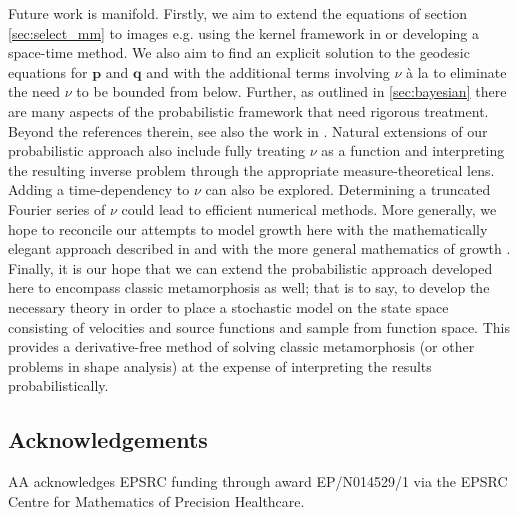 \documentclass[runningheads]{llncs}
\begin{document}
Future work is manifold. Firstly, we aim to extend the equations of section
\ref{sec:select_mm} to images e.g. using the kernel framework in
\cite{richardson2016metamorphosis} or developing a space-time method. We also
aim to find an explicit solution to the geodesic equations for $\mathbf p$ and
$\mathbf q$ and with the additional terms involving $\nu$ à la
\cite{trouve2005local} to eliminate the need $\nu$ to be bounded from below.
Further, as outlined in \ref{sec:bayesian} there
are many aspects of the probabilistic framework that need rigorous treatment.
Beyond the references therein, see also the work in \cite{dashti2013map}.
Natural extensions of our probabilistic approach also include fully treating
$\nu$ as a function and interpreting the resulting inverse problem through the
appropriate measure-theoretical lens. Adding a time-dependency to $\nu$ can also
be explored. Determining a truncated Fourier series of $\nu$ could lead to
efficient numerical methods. More generally, we hope to reconcile our attempts
to model growth here with the mathematically elegant approach described
in \cite{kaltenmark2016geometrical} and with the more general mathematics of
growth \cite{goriely2017mathematics}.\\

Finally, it is our hope that we can extend the probabilistic approach developed
here to encompass classic metamorphosis as well; that is to say, to develop the
necessary theory in order to place a stochastic model on the state space
consisting of velocities and source functions and sample from function space.
This provides a derivative-free method of solving classic metamorphosis (or
other problems in shape analysis) at the expense of interpreting the results
probabilistically.

\subsection*{Acknowledgements}
 AA acknowledges EPSRC funding through award EP/N014529/1 via
the EPSRC Centre for Mathematics of Precision Healthcare.




\end{document}

